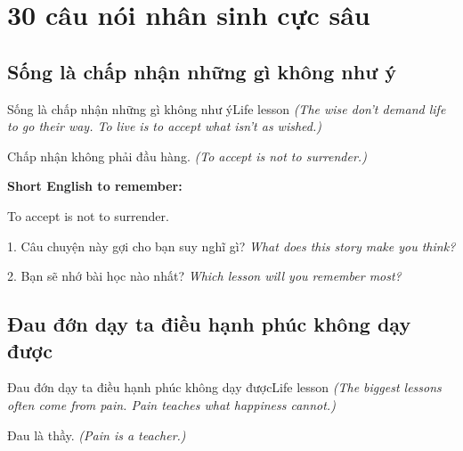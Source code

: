 \chapter{30 câu nói nhân sinh cực sâu}


\section{Sống là chấp nhận những gì không như ý}
\begin{truyen}{Sống là chấp nhận những gì không như ý}{Life lesson}
\textit{(The wise don't demand life to go their way. To live is to accept what isn't as wished.)}
\end{truyen}

\begin{baihoc}
Chấp nhận không phải đầu hàng.
\textit{(To accept is not to surrender.)}
\end{baihoc}

\begin{ghinhoanh}
\textbf{Short English to remember:}

To accept is not to surrender.

\end{ghinhoanh}

\begin{tuhocnhanh}
1. Câu chuyện này gợi cho bạn suy nghĩ gì? \textit{What does this story make you think?}

2. Bạn sẽ nhớ bài học nào nhất? \textit{Which lesson will you remember most?}
\end{tuhocnhanh}
\ngancach


\section{Đau đớn dạy ta điều hạnh phúc không dạy được}
\begin{truyen}{Đau đớn dạy ta điều hạnh phúc không dạy được}{Life lesson}
\textit{(The biggest lessons often come from pain. Pain teaches what happiness cannot.)}
\end{truyen}

\begin{baihoc}
Đau là thầy.
\textit{(Pain is a teacher.)}
\end{baihoc}

